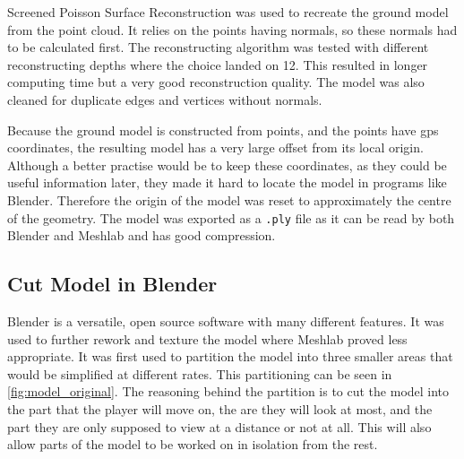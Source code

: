         Screened Poisson Surface Reconstruction\cite{kazhdan2013screened} was used to recreate the ground model from the point cloud. It relies on the points having normals, so these normals had to be calculated first. The reconstructing algorithm was tested with different reconstructing depths where the choice landed on 12. This resulted in longer computing time but a very good reconstruction quality. The model was also cleaned for duplicate edges and vertices without normals.
        
        Because the ground model is constructed from points, and the points have gps coordinates, the resulting model has a very large offset from its local origin. Although a better practise would be to keep these coordinates, as they could be useful information later, they made it hard to locate the model in programs like Blender. Therefore the origin of the model was reset to approximately the centre of the geometry. The model was exported as a \texttt{.ply} file as it can be read by both Blender and Meshlab and has good compression.
    
    \subsection{Cut Model in Blender}
        Blender\cite{blender} is a versatile, open source software with many different features. It was used to further rework and texture the model where Meshlab proved less appropriate. It was first used to partition the model into three smaller areas that would be simplified at different rates. This partitioning can be seen in \cref{fig:model_original}. The reasoning behind the partition is to cut the model into the part that the player will move on, the are they will look at most, and the part they are only supposed to view at a distance or not at all. This will also allow parts of the model to be worked on in isolation from the rest.
        
